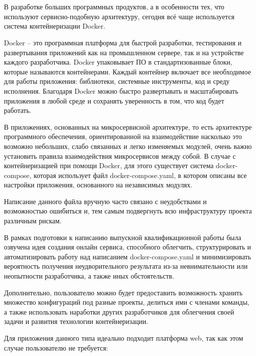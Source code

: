 \section*{}

В разработке больших программных продуктов, а в
особенности тех, что используют сервисно-подобную
архитектуру, сегодня всё чаще используется система контейнеризации Docker.

Docker – это программная платформа для быстрой разработки, тестирования
и развертывания приложений как на промышленном сервере, так и на устройстве
каждого разработчика. Docker упаковывает ПО в стандартизованные блоки,
которые называются контейнерами. Каждый контейнер включает все необходимое для
работы приложения: библиотеки, системные инструменты, код и среду исполнения.
Благодаря Docker можно быстро развертывать и масштабировать приложения в любой
среде и сохранять уверенность в том, что код будет работать.

В приложениях, основанных на микросервисной архитектуре, то есть архитектуре программного
обеспечения, ориентированной на взаимодействие насколько это возможно небольших,
слабо связанных и легко изменяемых модулей, очень важно установить правила взаимодействия
микросервисов между собой. В случае с контейнеризацией при помощи Docker, для этого
существует система docker-compose, которая использует файл docker-compose.yaml, в котором
описаны все настройки приложения, основанного на независимых модулях.

Написание данного файла вручную часто связано с неудобствами и возможностью ошибиться
и, тем самым подвергнуть всю инфраструктуру проекта различным рискам.

В рамках подготовки к написанию выпускной квалификационной работы была озвучена
идея создания онлайн сервиса, способного облегчить, структурировать и автоматизировать
работу над написанием docker-compose.yaml и минимизировать вероятность получения неудворительного
результата из-за невнимательности или неопытности разработчика, а также иных обстоятельств.

Дополнительно, пользователю можно будет предоставить возможность хранить множество
конфигураций под разные проекты, делиться ими с членами команды, а также использовать
наработки других разработчиков для облегчения своей задачи и развития технологии контейнеризации.

Для приложения данного типа идеально подходит платформа web, так как этом случае пользователю не требуется:


